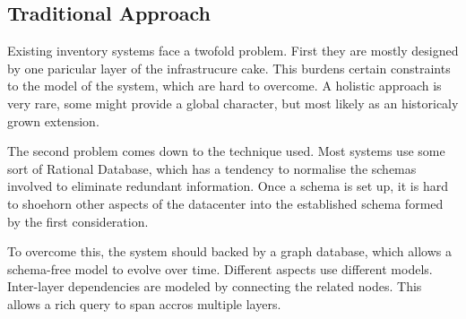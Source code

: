 \subsection{Traditional Approach}
Existing inventory systems face a twofold problem. First they are mostly designed by one paricular layer of the infrastrucure cake.
This burdens certain constraints to the model of the system, which are hard to overcome. A holistic approach is very rare, some might
provide a global character, but most likely as an historicaly grown extension.

The second problem comes down to the technique used. Most systems use some sort of Rational Database, which has a tendency to normalise
the schemas involved to eliminate redundant information. Once a schema is set up, it is hard to shoehorn other aspects of the datacenter into
the established schema formed by the first consideration.

To overcome this, the system should backed by a graph database, which allows a schema-free model to evolve over time. Different aspects
use different models. Inter-layer dependencies are modeled by connecting the related nodes. This allows a rich query to span accros multiple layers.

